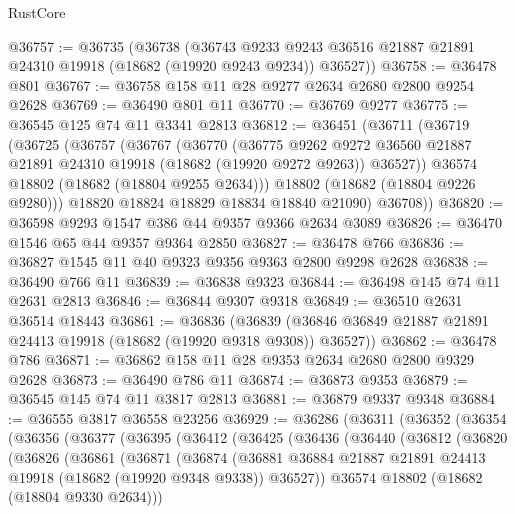 \begin{lexlean}{RustCore}
\begin{coremodule}
@36757 := @36735
    (@36738
      (@36743 @9233 @9243 @36516 @21887 @21891 @24310 @19918 (@18682 (@19920 @9243 @9234)) @36527))
@36758 := @36478 @801
@36767 := @36758 @158 @11 @28 @9277 @2634 @2680 @2800 @9254 @2628
@36769 := @36490 @801 @11
@36770 := @36769 @9277
@36775 := @36545 @125 @74 @11 @3341 @2813
@36812 := @36451
    (@36711
      (@36719
        (@36725
          (@36757
            (@36767
              (@36770
                (@36775
                  @9262
                  @9272
                  @36560
                  @21887
                  @21891
                  @24310
                  @19918
                  (@18682 (@19920 @9272 @9263))
                  @36527))
              @36574
              @18802
              (@18682 (@18804 @9255 @2634)))
            @18802
            (@18682 (@18804 @9226 @9280)))
          @18820
          @18824
          @18829
          @18834
          @18840
          @21090)
        @36708))
@36820 := @36598 @9293 @1547 @386 @44 @9357 @9366 @2634 @3089
@36826 := @36470 @1546 @65 @44 @9357 @9364 @2850
@36827 := @36478 @766
@36836 := @36827 @1545 @11 @40 @9323 @9356 @9363 @2800 @9298 @2628
@36838 := @36490 @766 @11
@36839 := @36838 @9323
@36844 := @36498 @145 @74 @11 @2631 @2813
@36846 := @36844 @9307 @9318
@36849 := @36510 @2631 @36514 @18443
@36861 := @36836
    (@36839 (@36846 @36849 @21887 @21891 @24413 @19918 (@18682 (@19920 @9318 @9308)) @36527))
@36862 := @36478 @786
@36871 := @36862 @158 @11 @28 @9353 @2634 @2680 @2800 @9329 @2628
@36873 := @36490 @786 @11
@36874 := @36873 @9353
@36879 := @36545 @145 @74 @11 @3817 @2813
@36881 := @36879 @9337 @9348
@36884 := @36555 @3817 @36558 @23256
@36929 := @36286
    (@36311
      (@36352
        (@36354
          (@36356
            (@36377
              (@36395
                (@36412
                  (@36425
                    (@36436
                      (@36440
                        (@36812
                          (@36820
                            (@36826
                              (@36861
                                (@36871
                                  (@36874
                                    (@36881
                                      @36884
                                      @21887
                                      @21891
                                      @24413
                                      @19918
                                      (@18682 (@19920 @9348 @9338))
                                      @36527))
                                  @36574
                                  @18802
                                  (@18682 (@18804 @9330 @2634)))

\end{coremodule}
\end{lexlean}
